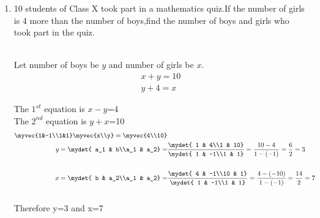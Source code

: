 \begin{enumerate}
\item 10 students of Class X took part in a mathematics quiz.If the number of girls is 4 more than the number of boys,find the number of boys and girls who took part in the quiz.
	
\solution \\
Let number of boys be $y$ and number of girls be $x$.\\
\begin{align}
x+y=10\\
y+4=x
\end{align}

The $1^{st}$ equation is $x-y$=4\\
The $2^{nd}$ equation is $y+x$=10\\
\begin{align}
\myvec{1&-1\\1&1} \myvec{x\\y}=\myvec{4\\10}\\
y=\mydet{ a_1 & b\\a_1 & a_2} =&
\frac{\mydet{ 1 & 4\\1 & 10}}{\mydet{ 1 & -1\\1 & 1}}
=\frac{10-4}{1-(-1)}
=\frac{6}{2}
=3 \\ \\
x=\mydet{ b & a_2\\a_1 & a_2} =&
\frac{\mydet{ 4 & -1\\10 & 1}}{\mydet{ 1 & -1\\1 & 1}}
=\frac{4-(-10)}{1-(-1)}
=\frac{14}{2}
=7\\ \\
\end{align}
Therefore  y=3 and x=7
\end{enumerate}
